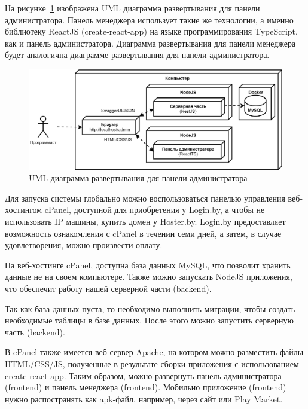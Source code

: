 На рисунке~\ref{fig:db_UML_deployment_admin} изображена UML диаграмма развертывания для панели администратора.
Панель менеджера использует такие же технологии, а именно библиотеку ReactJS (create-react-app) на языке программирования TypeScript,
как и панель администратора.
Диаграмма развертывания для панели менеджера будет аналогична диаграмме развертывания для панели администратора.

\begin{figure}[!h]
    \centering

    \includegraphics[width=13cm]
    {images/UML/deployment/admin.png}

    \caption{UML диаграмма развертывания для панели администратора}

    \label{fig:db_UML_deployment_admin}
\end{figure}

Для запуска системы глобально можно воспользоваться панелью управления веб-хостингом cPanel,
доступной для приобретения у Login.by, а чтобы не использовать IP машины, купить домен у Hoster.by.
Login.by предоставляет возможность ознакомления с cPanel в течении семи дней,
а затем, в случае удовлетворения, можно произвести оплату.

На веб-хостинге cPanel, доступна база данных MySQL, что позволит хранить данные не на своем компьютере.
Также можно запускать NodeJS приложения, что обеспечит работу нашей серверной части (backend).

Так как база данных пуста, то необходимо выполнить миграции, чтобы создать необходимые таблицы в базе данных.
После этого можно запустить серверную часть (backend).

В cPanel также имеется веб-сервер Apache, на котором можно разместить файлы HTML/CSS/JS,
полученные в результате сборки приложения с использованием create-react-app.
Таким образом, можно развернуть панель администратора (frontend) и панель менеджера (frontend).
Мобильно приложение (frontend) нужно распостранять как apk-файл, например, через сайт или Play Market.

